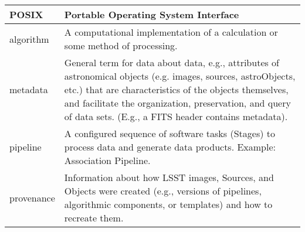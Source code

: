\begin{longtable}{|l|p{}|}
POSIX & Portable Operating System Interface \\\hline
algorithm & A computational implementation of a calculation or some method of processing. \\\hline
metadata & General term for data about data, e.g., attributes of astronomical objects (e.g. images, sources, astroObjects, etc.) that are characteristics of the objects themselves, and facilitate the organization, preservation, and query of data sets. (E.g., a FITS header contains metadata). \\\hline
pipeline & A configured sequence of software tasks (Stages) to process data and generate data products. Example: Association Pipeline. \\\hline
provenance & Information about how LSST images, Sources, and Objects were created (e.g., versions of pipelines, algorithmic components, or templates) and how to recreate them. \\\hline
\end{longtable}
